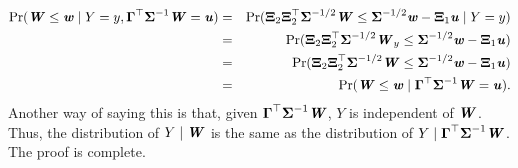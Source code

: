 \documentclass[12pt]{article}
\def \bfitu{\mbox{\textbf{\textit{u}}}}
\def \bfitw{\mbox{\textbf{\textit{w}}}}
\def \bfitW{\mbox{\textbf{\textit{W}}}}
\def \bfGamma{\mbox{\boldmath $\Gamma$}}
\def \bfXi{\mbox{\boldmath $\Xi$}}
\def \bfSigma{\mbox{\boldmath $\Sigma$}}
\begin{document}
\begin{eqnarray*}
\operatorname{Pr}(\bfitW \leq \bfitw \mid Y = y, \bfGamma^{\top} \bfSigma^{-1} \bfitW = \bfitu) &=& \operatorname{Pr}(\bfXi_2 \bfXi_2^{\top} \bfSigma^{-1/2} \bfitW \leq  \bfSigma^{-1/2} \bfitw - \bfXi_1 \bfitu \mid Y = y) \\
&=& \operatorname{Pr}(\bfXi_2 \bfXi_2^{\top} \bfSigma^{-1/2} \bfitW_y \leq  \bfSigma^{-1/2} \bfitw - \bfXi_1 \bfitu) \\
&=& \operatorname{Pr}(\bfXi_2 \bfXi_2^{\top} \bfSigma^{-1/2} \bfitW \leq  \bfSigma^{-1/2} \bfitw - \bfXi_1 \bfitu) \\
&=& \operatorname{Pr}(\bfitW \leq \bfitw \mid \bfGamma^{\top} \bfSigma^{-1} \bfitW = \bfitu).
\end{eqnarray*}
Another way of saying this is that, given $\bfGamma^{\top} \bfSigma^{-1} \bfitW$, $Y$ is independent of $\bfitW$. Thus, the distribution of $Y \mid \bfitW$ is the same as the distribution of $Y \mid \bfGamma^{\top} \bfSigma^{-1} \bfitW$. The proof is complete.

\end{document}
